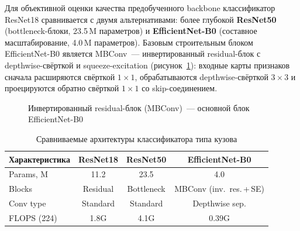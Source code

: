 \documentclass[10pt,a4paper]{report}
\numberwithin{equation}{chapter}
\numberwithin{figure}{chapter}
\numberwithin{table}{chapter}
\begin{document}
Для объективной оценки качества предобученного backbone классификатор
ResNet18 сравнивается с двумя альтернативами: более глубокой
\textbf{ResNet50} (bottleneck-блоки, 23.5\,M параметров) и
\textbf{EfficientNet-B0} (составное масштабирование, 4.0\,M параметров).
Базовым строительным блоком EfficientNet-B0 является MBConv~---
инвертированный residual-блок с depthwise-свёрткой и squeeze-excitation
(рисунок~\ref{fig:mobilenet}): входные карты признаков сначала расширяются
свёрткой $1\times1$, обрабатываются depthwise-свёрткой $3\times3$ и
проецируются обратно свёрткой $1\times1$ со skip-соединением.

\begin{figure}[H]
\centering
{}
\caption{Инвертированный residual-блок (MBConv)~--- основной блок EfficientNet-B0}
\label{fig:mobilenet}
\end{figure}

\begin{table}[H]
\centering
\caption{Сравниваемые архитектуры классификатора типа кузова}
\label{tab:r18_mv2}
\begin{tabular}{lccc}
\toprule
\textbf{Характеристика} & \textbf{ResNet18} & \textbf{ResNet50} & \textbf{EfficientNet-B0} \\
\midrule
Params, M   & 11.2          & 23.5            & 4.0 \\
Blocks      & Residual      & Bottleneck      & MBConv (inv.\ res.\,+\,SE) \\
Conv type   & Standard      & Standard        & Depthwise sep. \\
FLOPS (224) & 1.8G          & 4.1G            & 0.39G \\
\bottomrule
\end{tabular}
\end{table}
\end{document}
